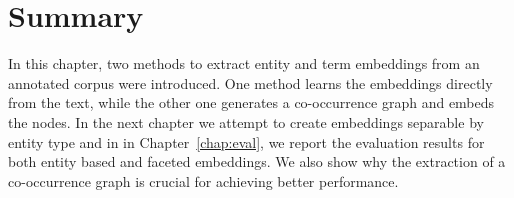 \section{Summary}\label{sec:entity_summary}
In this chapter, two methods to extract entity and term embeddings from an annotated corpus were introduced. One method learns the embeddings directly from the text, while the other one generates a co-occurrence graph and embeds the nodes. In the next chapter we attempt to create embeddings separable by entity type and in in Chapter~\ref{chap:eval}, we report the evaluation results for both entity based and faceted embeddings. We also show why the extraction of a co-occurrence graph is crucial for achieving better performance. 
